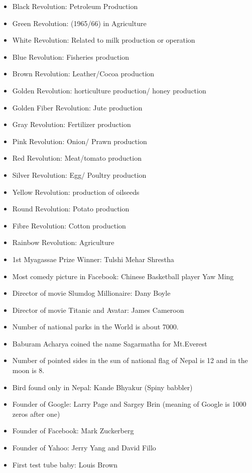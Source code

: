 \documentclass[
  openany]{book}
\begin{document}
\begin{itemize}
\item
  Black Revolution: Petroleum Production
\item
  Green Revolution: (1965/66) in Agriculture
\item
  White Revolution: Related to milk production or operation
\item
  Blue Revolution: Fisheries production
\item
  Brown Revolution: Leather/Cocoa production
\item
  Golden Revolution: horticulture production/ honey production
\item
  Golden Fiber Revolution: Jute production
\item
  Gray Revolution: Fertilizer production
\item
  Pink Revolution: Onion/ Prawn production
\item
  Red Revolution: Meat/tomato production
\item
  Silver Revolution: Egg/ Poultry production
\item
  Yellow Revolution: production of oilseeds
\item
  Round Revolution: Potato production
\item
  Fibre Revolution: Cotton production
\item
  Rainbow Revolution: Agriculture
\item
  1st Myagassae Prize Winner: Tulshi Mehar Shrestha
\item
  Most comedy picture in Facebook: Chinese Basketball player Yaw Ming
\item
  Director of movie Slumdog Millionaire: Dany Boyle
\item
  Director of movie Titanic and Avatar: James Cameroon
\item
  Number of national parks in the World is about 7000.
\item
  Baburam Acharya coined the name Sagarmatha for Mt.Everest
\item
  Number of pointed sides in the sun of national flag of Nepal is 12 and in the moon is 8.
\item
  Bird found only in Nepal: Kande Bhyakur (Spiny babbler)
\item
  Founder of Google: Larry Page and Sargey Brin (meaning of Google is 1000 zeros after one)
\item
  Founder of Facebook: Mark Zuckerberg
\item
  Founder of Yahoo: Jerry Yang and David Fillo
\item
  First test tube baby: Louis Brown
\end{itemize}
\end{document}

